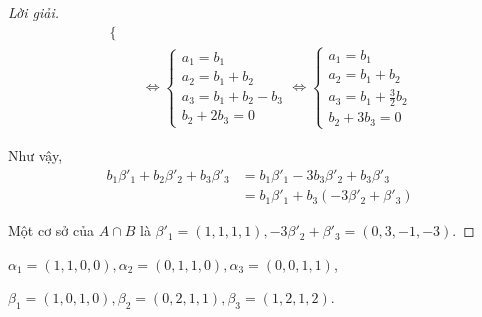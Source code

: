 \documentclass[class=linearalgebra,crop=false]{standalone}
\begin{document}
\begin{proof}[Lời giải]
\begin{align*}
\begin{cases}
        \end{cases}                       \\
         & \Longleftrightarrow\begin{cases}
            a_{1} = b_{1}                 \\
            a_{2} = b_{1} + b_{2}         \\
            a_{3} = b_{1} + b_{2} - b_{3} \\
            b_{2} + 2b_{3} = 0
        \end{cases}
        \Longleftrightarrow
        \begin{cases}
            a_{1} = b_{1}                    \\
            a_{2} = b_{1} + b_{2}            \\
            a_{3} = b_{1} + \frac{3}{2}b_{2} \\
            b_{2} + 3b_{3} = 0
        \end{cases}
    \end{align*}
    \par Như vậy,
    \begin{align*}
        b_{1}\beta'_{1} + b_{2}\beta'_{2} + b_{3}\beta'_{3}
         & = b_{1}\beta'_{1} - 3b_{3}\beta'_{2} + b_{3}\beta'_{3} \\
         & = b_{1}\beta'_{1} + b_{3}(-3\beta'_{2} + \beta'_{3})
    \end{align*}
    \par Một cơ sở của $A\cap B$ là $\beta'_{1} = (1,1,1,1), -3\beta'_{2} + \beta'_{3} = (0, 3, -1, -3)$.
\end{proof}

\begin{exercise}$\alpha_{1} = (1,1,0,0), \alpha_{2} = (0,1,1,0), \alpha_{3} = (0,0,1,1)$,
    \par $\beta_{1} = (1,0,1,0), \beta_{2} = (0,2,1,1), \beta_{3} = (1,2,1,2)$.
\end{exercise}
\end{document}

